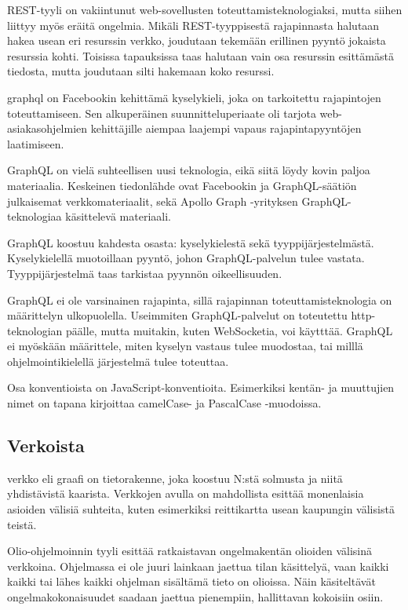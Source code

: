 REST-tyyli on vakiintunut web-sovellusten toteuttamisteknologiaksi,
mutta siihen liittyy myös eräitä ongelmia. Mikäli REST-tyyppisestä
rajapinnasta halutaan hakea usean eri resurssin verkko, joudutaan
tekemään erillinen pyyntö jokaista resurssia kohti. Toisissa tapauksissa
taas halutaan vain osa resurssin esittämästä tiedosta, mutta joudutaan
silti hakemaan koko
resurssi.\cite{betterRESTPrisma}\cite{WhyUseGraphQLApollo}

\gls{graphql} on Facebookin kehittämä kyselykieli, joka on tarkoitettu
rajapintojen toteuttamiseen. Sen alkuperäinen suunnitteluperiaate oli
tarjota web-asiakasohjelmien kehittäjille aiempaa laajempi vapaus
rajapintapyyntöjen laatimiseen. \cite{graphql:spec}

GraphQL on vielä suhteellisen uusi teknologia, eikä siitä löydy kovin
paljoa materiaalia. Keskeinen tiedonlähde ovat
Facebookin\cite{graphql:spec} ja GraphQL-säätiön\cite{GraphQLOrg}
julkaisemat verkkomateriaalit, sekä Apollo Graph -yrityksen
GraphQL-teknologiaa käsittelevä materiaali.\cite{ApolloGraphQL}

GraphQL koostuu kahdesta osasta: kyselykielestä sekä
tyyppijärjestelmästä. Kyselykielellä muotoillaan pyyntö, johon
GraphQL-palvelun tulee vastata. Tyyppijärjestelmä taas tarkistaa pyynnön
oikeellisuuden.

GraphQL ei ole varsinainen rajapinta, sillä rajapinnan
toteuttamisteknologia on määrittelyn ulkopuolella. Useimmiten
GraphQL-palvelut on toteutettu \gls{http}-teknologian päälle, mutta
muitakin, kuten WebSocketia, voi käytttää. GraphQL ei myöskään
määrittele, miten kyselyn vastaus tulee muodostaa, tai milllä
ohjelmointikielellä järjestelmä tulee toteuttaa.

Osa konventioista on JavaScript-konventioita. Esimerkiksi kentän- ja
muuttujien nimet on tapana kirjoittaa camelCase- ja PascalCase
-muodoissa.\cite{GraphQLSchemaBasics}

\hypertarget{verkoista}{%
\subsection{Verkoista}\label{verkoista}}

\gls{verkko} eli graafi on tietorakenne, joka koostuu N:stä solmusta ja
niitä yhdistävistä kaarista.\cite{pozrikidis2014introduction} Verkkojen
avulla on mahdollista esittää monenlaisia asioiden välisiä suhteita,
kuten esimerkiksi reittikartta usean kaupungin välisistä teistä.

Olio-ohjelmoinnin tyyli esittää ratkaistavan ongelmakentän olioiden
välisinä verkkoina. Ohjelmassa ei ole juuri lainkaan jaettua tilan
käsittelyä, vaan kaikki kaikki tai lähes kaikki ohjelman sisältämä tieto
on olioissa. Näin käsiteltävät ongelmakokonaisuudet saadaan jaettua
pienempiin, hallittavan kokoisiin osiin. \cite{booch2008object}

